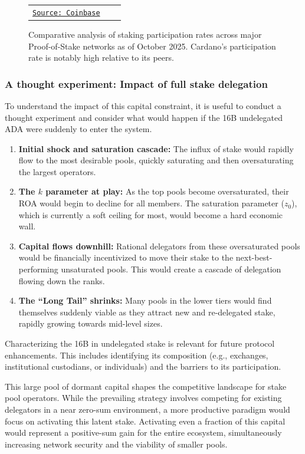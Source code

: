 \documentclass[11pt, letterpaper]{article}
\begin{document}
\begin{figure}[H]
\begin{tabular}{ccc}
\begin{minipage}{0.3\textwidth}
			\caption*{Avalanche}
			\href{https://www.coinbase.com/earn/staking/avalanche}{\texttt{\scriptsize Source: Coinbase}}
		\end{minipage}
	\end{tabular}
	\caption{Comparative analysis of staking participation rates across major Proof-of-Stake networks as of October 2025. Cardano's participation rate is notably high relative to its peers.}
	\label{fig:pos_comparison}
\end{figure}

\subsubsection*{A thought experiment: Impact of full stake delegation}

To understand the impact of this capital constraint, it is useful to
conduct a thought experiment and consider what would happen if the 16B
undelegated ADA were suddenly to enter the system.

\begin{enumerate}
	\item \textbf{Initial shock and saturation cascade:} The influx of stake would rapidly flow to the most desirable pools,
	      quickly saturating and then oversaturating the largest operators.
	\item \textbf{The $k$ parameter at play:} As the top pools become oversaturated, their ROA would begin to decline
	      for all members. The saturation parameter ($z_0$), which is currently a soft ceiling for most, would become a hard economic wall.
	\item \textbf{Capital flows downhill:} Rational delegators from these oversaturated pools would be financially incentivized to
	      move their stake to the next-best-performing unsaturated pools. This would create a cascade of delegation flowing down the ranks.
	\item \textbf{The ``Long Tail'' shrinks:} Many pools in the lower tiers would find themselves suddenly viable as they attract
	      new and re-delegated stake, rapidly growing towards mid-level sizes.
\end{enumerate}

Characterizing the 16B in undelegated stake is relevant for future protocol enhancements. This
includes identifying its composition (e.g., exchanges, institutional custodians, or individuals) and
the barriers to its participation.

This large pool of dormant capital shapes the competitive landscape for stake
pool operators. While the prevailing strategy involves competing for existing
delegators in a near zero-sum environment, a more productive paradigm would
focus on activating this latent stake. Activating even a fraction of this
capital would represent a positive-sum gain for the entire ecosystem,
simultaneously increasing network security and the viability of smaller pools.
\end{document}
